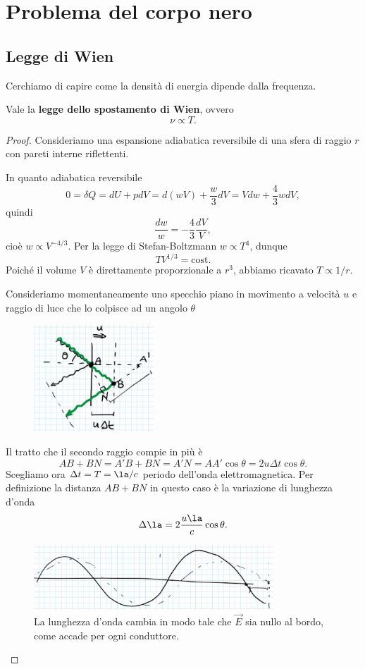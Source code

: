 \section{Problema del corpo nero}
\subsection{Legge di Wien}
Cerchiamo di capire come la densit\`a di energia dipende dalla frequenza.

\begin{proposition}\label{LeggeSpostamentoWien}
Vale la \textbf{legge dello spostamento di Wien}, ovvero
\[\nu\propto T.\]
\end{proposition}
\begin{proof}
Consideriamo una espansione adiabatica reversibile di una sfera di raggio $r$ con pareti interne riflettenti.\medskip

\noindent
In quanto adiabatica reversibile
\[0=\delta Q=dU+pdV=d(wV)+\frac w3 dV=Vdw+\frac 43wdV,\]
quindi
\[\frac{dw}w=-\frac43\frac{dV}V,\]
cio\`e $w\propto V^{-4/3}$. Per la legge di Stefan-Boltzmann $w\propto T^4$, dunque
\[TV^{1/3}=\text{cost.}\]
Poich\'e il volume $V$ \`e direttamente proporzionale a $r^3$, abbiamo ricavato $T\propto 1/r$.

\noindent
Consideriamo momentaneamente uno specchio piano in movimento a velocit\`a $u$ e raggio di luce che lo colpisce ad un angolo $\theta$

\begin{figure}[!htb]
    \centering
    \includegraphics[width=4.5cm]{images/movimento_specchio.png}
\end{figure}\newpage

\noindent
Il tratto che il secondo raggio compie in pi\`u \`e 
\[AB+BN=A'B+BN=A'N=AA'\cos \theta=2u\Delta t \cos \theta.\]
Scegliamo ora $\Delta t=T=\la/c$ periodo dell'onda elettromagnetica. Per definizione la distanza $AB+BN$ in questo caso \`e la variazione di lunghezza d'onda
\[\Delta \la=2\frac {u\la} c\cos \theta.\]
\begin{figure}[!htb]
    \centering
    \includegraphics[width=9cm]{images/cambiamento_lunghezza_onda.png}
    \caption{La lunghezza d'onda cambia in modo tale che $\vec E$ sia nullo al bordo, come accade per ogni conduttore.}
\end{figure}


\end{proof}
